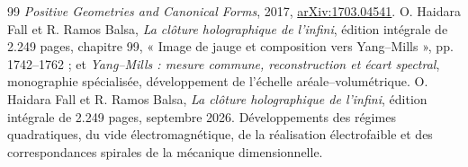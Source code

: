 \documentclass[a4paper,10pt]{article}
\theoremstyle{definition}\newtheorem{definition}[theorem]{Définition}
\theoremstyle{remark}\newtheorem{remark}[theorem]{Remarque}
\numberwithin{equation}{section}
\begin{document}
\begin{thebibliography}{99}
\emph{Positive Geometries and Canonical Forms}, 2017,
\href{https://arxiv.org/abs/1703.04541}{arXiv:1703.04541}.
 O. Haidara Fall et R. Ramos Balsa,
\emph{La clôture holographique de l’infini}, édition intégrale de 2.249 pages,
chapitre 99, « Image de jauge et composition vers Yang--Mills », pp. 1742--1762 ;
et \emph{Yang--Mills : mesure commune, reconstruction et écart spectral},
monographie spécialisée, développement de l’échelle aréale--volumétrique.
 O. Haidara Fall et R. Ramos Balsa,
\emph{La clôture holographique de l’infini}, édition intégrale de 2.249 pages,
septembre 2026. Développements des régimes quadratiques, du vide
électromagnétique, de la réalisation électrofaible et des correspondances
spirales de la mécanique dimensionnelle.

\end{thebibliography}
\end{document}
